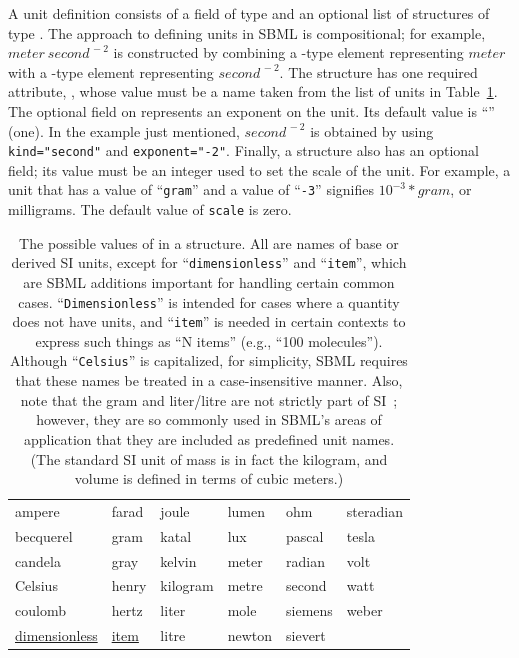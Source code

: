 \documentclass[10pt]{cekarticle}
\newcommand{\changed}[1]{\textcolor{BrickRed}{#1}}
\begin{document}
A unit definition consists of a  field of type 
and an optional list of structures of type .  The approach to
defining units in SBML is compositional; for example, $meter\ 
second^{\,-2}$ is constructed by combining a -type element
representing $meter$ with a -type element representing
$second^{\,-2}$.  
\changed{The \class{Unit} structure has one
  required attribute, \attrib{kind}, whose value must be a name taken from
  the list of units in Table~\ref{tab:unitkind}.  The optional
  \attrib{exponent} field on \class{Unit} represents an exponent on the
  unit.}
Its default value is ``'' (one).  In the example just
mentioned, $second^{\,-2}$ is obtained by using \texttt{kind="second"} and
\texttt{exponent="-2"}.
\changed{Finally, a  structure also has an
optional \attrib{scale} field; its value must be an integer used to set the
scale of the unit.}
For example, a unit that has a  value of
``\texttt{gram}'' and a  value of ``\texttt{-3}'' signifies
$10^{-3} * gram$, or milligrams.
\changed{The default value of \texttt{scale} is zero.}


\begin{table}[thb]
  \centering
  \ttfamily
  \begin{tabular}{llllll}
    \toprule
    ampere      	& farad	& joule		& lumen		& ohm     & steradian\\
    becquerel   	& gram	& katal		& lux		& pascal  & tesla\\
    candela		& gray	& kelvin	& meter		& radian  & volt\\
    \changed{Celsius}	& henry	& kilogram	& metre		& second  & watt\\
    coulomb		& hertz	& liter		& mole		& siemens & weber\\
    \underline{dimensionless} & \underline{item} & litre	& newton	& sievert\\
    \bottomrule
  \end{tabular}
  \caption{The possible values of  in a 
    structure.  All are names of base or derived SI units, except for
    ``\texttt{dimensionless}'' and ``\texttt{item}'', which are 
    SBML additions important for handling certain common cases.
    ``\texttt{Dimensionless}'' is intended for cases where a quantity does not
    have units, and ``\texttt{item}'' is  needed in certain contexts to express
    such things as ``N items'' (e.g., ``100 molecules'').
    \changed{Although ``\texttt{Celsius}'' is capitalized, for 
    simplicity, SBML
    requires that these names be treated in a case-insensitive manner.
    Also, note that the gram and liter/litre are not
    strictly part of SI~\protect\citep{bipm:2000}; however, they are so
    commonly used in SBML's areas of application that they 
    are included as predefined unit names.}  (The standard SI unit of
    mass is in fact the kilogram, and volume is
    defined in terms of cubic meters.)}
  \label{tab:unitkind}
\end{table}
\end{document}
